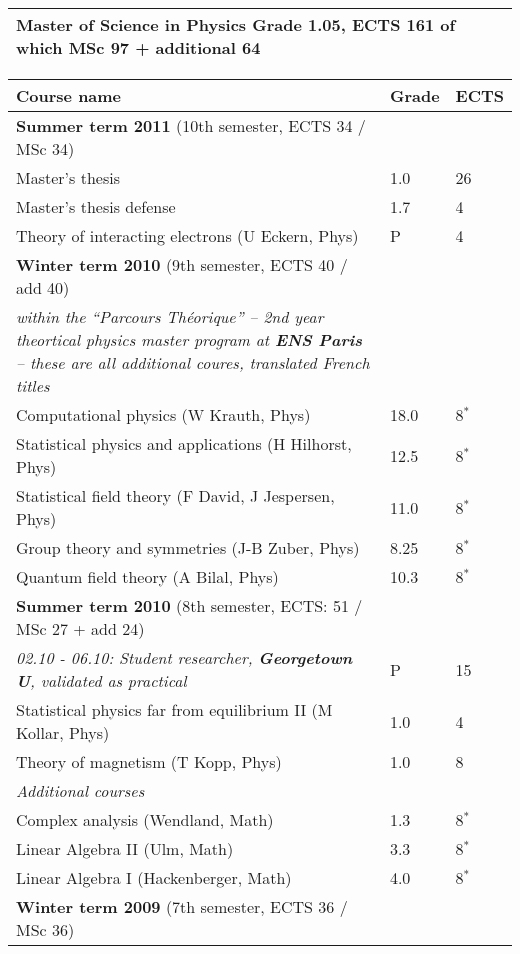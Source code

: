 {\noindent \begin{longtable}[t]{p{}}
\textbf{\normalsize{Master of Science in Physics}}
Grade 1.05, ECTS 161 of which MSc 97 + additional 64
\\ \hline \hline
\end{longtable}
\vspace{-2em}\noindent \begin{longtable}[t]{p{\widthA} p{\widthB} p{\widthC}}
Course name
& Grade
& ECTS \\ \hline
\textbf{Summer term 2011} (10th semester, ECTS 34 / MSc 34)\\
Master's thesis
& 1.0
& 26\\
Master's thesis defense
& 1.7
& 4\\
Theory of interacting electrons (U Eckern, Phys)
& P
& 4\\
 \hline
\textbf{Winter term 2010} (9th semester, ECTS 40 / add 40)\\
\textit{within the ``Parcours Th\'eorique'' -- 2nd year theortical physics master program at \textbf{ENS Paris}} \textit{-- these are all additional coures, translated French titles}\\
Computational physics (W Krauth, Phys)
& 18.0\footnotemark[4]
& 8$^*$\\
Statistical physics and applications (H Hilhorst, Phys)
& 12.5
& 8$^*$\\
Statistical field theory (F David, J Jespersen, Phys)
& 11.0
& 8$^*$\\
Group theory and symmetries (J-B Zuber, Phys)
& 8.25
& 8$^*$\\
Quantum field theory (A Bilal, Phys)
& 10.3 
& 8$^*$\\
\hline
\textbf{Summer term 2010} (8th semester, ECTS: 51 / MSc 27 + add 24)\\
\textit{02.10 - 06.10: Student researcher, \textbf{Georgetown U}, validated as practical }
& P
& 15 \\
Statistical physics far from equilibrium II  (M Kollar, Phys)
& 1.0
& 4\\
Theory of magnetism (T Kopp, Phys)
& 1.0
& 8\\
\textit{Additional courses}\\
Complex analysis (Wendland, Math)
& 1.3
& 8$^*$\\
Linear Algebra II (Ulm, Math)
& 3.3
& 8$^*$\\
Linear Algebra I (Hackenberger, Math)
& 4.0
& 8$^*$\\
 \hline
\textbf{Winter term 2009} (7th semester, ECTS 36 / MSc 36)\\

\end{longtable}}
